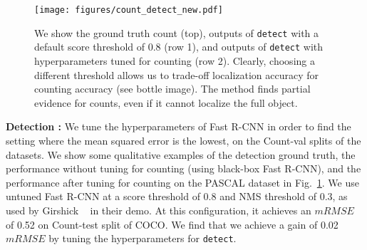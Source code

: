 \documentclass[10pt,twocolumn,letterpaper]{article}
\newcommand{\detect}{\texttt{detect}\xspace}
\newcommand{\glance}{\texttt{glance}\xspace}
\newcommand{\pascal}{PASCAL\xspace}
\begin{document}
\begin{figure}[t]
\centering     \texttt{[image: figures/count\_detect\_new.pdf]}
\vspace{-15pt}
\caption{\footnotesize{We show the ground truth count (top), outputs of \detect{} with a default score threshold of 0.8 (row 1), and outputs of \detect{} with hyperparameters tuned for counting (row 2). Clearly, choosing a different threshold allows us to trade-off localization accuracy for counting accuracy (see bottle image). The method finds partial evidence for counts, even if it cannot localize the full object.}}
\label{fig:b}
\vspace{-10pt}
\end{figure}
\par \noindent
\textbf{Detection : }We tune the hyperparameters of Fast R-CNN in order to find the setting where the mean squared error is the lowest, on the Count-val splits of the datasets. We show some qualitative examples of the detection ground truth, the performance without tuning for counting (using black-box Fast R-CNN), and the performance after tuning for counting on the \pascal dataset in  Fig.~\ref{fig:b}. We use untuned Fast R-CNN at a score threshold of 0.8 and NMS threshold of 0.3, as used by Girshick \etal~\cite{Girshick2015FastR-CNN} in their demo. At this configuration, it achieves an $mRMSE$ of 0.52 on Count-test split of COCO. We find that we achieve a gain of 0.02 $mRMSE$ by tuning the hyperparameters for \detect{}.
\begin{comment}
\begin{table} \footnotesize
\setlength{\tabcolsep}{5.5pt}
\begin{center}
\begin{tabular}{@{} l  c  c c @{}}
\toprule
Approach & mRMSE & mRMSE\\
\midrule
\glance{}\texttt{-fn-1L} & 0.53 & 0.13\\
\glance{}\texttt{-fn-2L} & 0.52 & 0.11\\
\glance{}\texttt{-nofn-1L} & 0.50 & 0.11\\
\glance{}\texttt{-nofn-2L} & 0.50 & 0.11\\
\bottomrule
\end{tabular}
\caption{mRMSE and m-relRMSE(count-MRMSE) , as well as their non-zero variants, of various methods for counting on second half of COCO VAL dataset. \textbf{Lower} is better.}
\label{table:sub}
\vspace{-8pt}
\end{center}
\end{table}
\end{comment}
\end{document}

